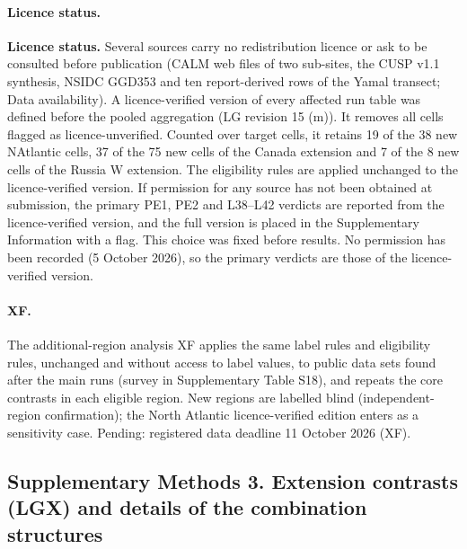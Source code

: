 \paragraph*{Licence status.} \textbf{Licence status.} Several sources carry no redistribution licence or ask to be consulted before publication (CALM web files of two sub-sites, the CUSP v1.1 synthesis, NSIDC GGD353 and ten report-derived rows of the Yamal transect; Data availability). A licence-verified version of every affected run table was defined before the pooled aggregation (LG revision 15 (m)). It removes all cells flagged as licence-unverified. Counted over target cells, it retains 19 of the 38 new NAtlantic cells, 37 of the 75 new cells of the Canada extension and 7 of the 8 new cells of the Russia W extension. The eligibility rules are applied unchanged to the licence-verified version. If permission for any source has not been obtained at submission, the primary PE1, PE2 and L38–L42 verdicts are reported from the licence-verified version, and the full version is placed in the Supplementary Information with a flag. This choice was fixed before results. No permission has been recorded (5 October 2026), so the primary verdicts are those of the licence-verified version.

\paragraph*{XF.} The additional-region analysis XF applies the same label rules and eligibility rules, unchanged and without access to label values, to public data sets found after the main runs (survey in Supplementary Table S18), and repeats the core contrasts in each eligible region. New regions are labelled blind (independent-region confirmation); the North Atlantic licence-verified edition enters as a sensitivity case. Pending: registered data deadline 11 October 2026 (XF).

\subsection*{Supplementary Methods 3. Extension contrasts (LGX) and details of the combination structures}

